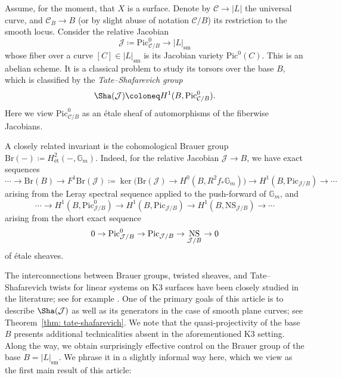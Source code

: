 \documentclass[11pt]{amsart}
\theoremstyle{plain}
\theoremstyle{definition}
\theoremstyle{remark}
\newcommand{\Pic}{\mathop{\rm Pic}\nolimits}
\DeclareMathOperator{\NS}{NS}
\begin{document}
Assume, for the moment, that $X$ is a surface. Denote by $\mathcal{C} \to |L|$ the universal curve, and $\mathcal{C}_B \to B$ (or by slight abuse of notation $\mathcal{C}/B$) its restriction to the smooth locus. Consider the relative Jacobian
\[
\mathcal{J} \coloneq \mathrm{Pic}^0_{\mathcal{C}/B} \to |L|_\mathrm{sm}
\]
whose fiber over a curve $[C]\in |L|_\mathrm{sm}$ is its Jacobian variety $\mathrm{Pic}^0(C)$. This is an abelian scheme. It is a classical problem to study its torsors over the base $B$, which is classified by the \textit{Tate--Shafarevich group}
\[
\Sha(\mathcal{J}) \coloneq H^1(B, \Pic^0_{\mathcal C / B}).
\]
Here we view $\mathrm{Pic}^0_{\mathcal{C}/B}$ as an étale sheaf of automorphisms of the fiberwise Jacobians.

\smallskip

A closely related invariant is the cohomological Brauer group $\mathrm{Br}(-)\coloneq H^2_{\textrm{ét}}(-,\mathbb G_m)$. Indeed, for the relative Jacobian $\mathcal{J} \to B$, we have exact sequences
\begin{equation}\label{eq: leray intro}
\cdots \to \mathrm{Br}(B) \to F^1 \mathrm{Br}(\mathcal{J}) \coloneq \ker\big(\mathrm{Br}(\mathcal{J}) \to H^0(B, R^2 f_* \mathbb G_m)\big) \to H^1(B, \mathrm{Pic}_{\mathcal{J}/B}) \to \cdots
\end{equation}
arising from the Leray spectral sequence applied to the push-forward of $\mathbb G_m$, and 
\begin{equation}\label{eq: exponential intro}
\cdots \to H^1(B, \mathrm{Pic}^0_{\mathcal{J}/B}) \to H^1(B, \mathrm{Pic}_{\mathcal{J}/B}) \to  H^1(B, \mathrm{NS}_{\mathcal{J}/B}) \to \cdots
\end{equation}
arising from the short exact sequence
$$0 \to \Pic^0_{\mathcal J / B} \to \Pic_{\mathcal J/B} \to \NS_{\mathcal J/B} \to 0$$ of \'etale sheaves.

The interconnections between Brauer groups, twisted sheaves, and Tate--Shafarevich twists for linear systems on K3 surfaces have been closely studied in the literature; see for example \cite{Markman, HM1, Mattei-Meinsma, HM2}. 
One of the primary goals of this article is to describe $\Sha(\mathcal{J})$ as well as its generators in the case of smooth plane curves; see Theorem~\ref{thm: tate-shafarevich}. We note that the quasi-projectivity of the base $B$ presents additional technicalities absent in the aforementioned 
K3 setting. Along the way, we obtain surprisingly effective control on the Brauer group of the base $B = |L|_\mathrm{sm}$. We phrase it in a slightly informal way here, which we view as the first main result of this article:
\end{document}

